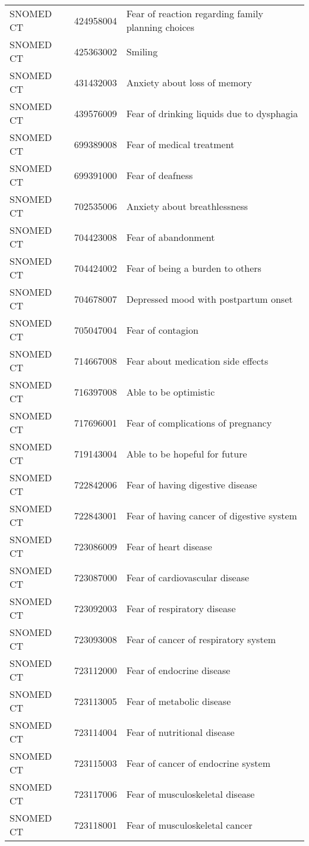 \begin{longtable}{p{}p{}p{}}
  SNOMED CT & 424958004 & Fear of reaction regarding family planning choices \\ 
  SNOMED CT & 425363002 & Smiling \\ 
  SNOMED CT & 431432003 & Anxiety about loss of memory \\ 
  SNOMED CT & 439576009 & Fear of drinking liquids due to dysphagia \\ 
  SNOMED CT & 699389008 & Fear of medical treatment \\ 
  SNOMED CT & 699391000 & Fear of deafness \\ 
  SNOMED CT & 702535006 & Anxiety about breathlessness \\ 
  SNOMED CT & 704423008 & Fear of abandonment \\ 
  SNOMED CT & 704424002 & Fear of being a burden to others \\ 
  SNOMED CT & 704678007 & Depressed mood with postpartum onset \\ 
  SNOMED CT & 705047004 & Fear of contagion \\ 
  SNOMED CT & 714667008 & Fear about medication side effects \\ 
  SNOMED CT & 716397008 & Able to be optimistic \\ 
  SNOMED CT & 717696001 & Fear of complications of pregnancy \\ 
  SNOMED CT & 719143004 & Able to be hopeful for future \\ 
  SNOMED CT & 722842006 & Fear of having digestive disease \\ 
  SNOMED CT & 722843001 & Fear of having cancer of digestive system \\ 
  SNOMED CT & 723086009 & Fear of heart disease \\ 
  SNOMED CT & 723087000 & Fear of cardiovascular disease \\ 
  SNOMED CT & 723092003 & Fear of respiratory disease \\ 
  SNOMED CT & 723093008 & Fear of cancer of respiratory system \\ 
  SNOMED CT & 723112000 & Fear of endocrine disease \\ 
  SNOMED CT & 723113005 & Fear of metabolic disease \\ 
  SNOMED CT & 723114004 & Fear of nutritional disease \\ 
  SNOMED CT & 723115003 & Fear of cancer of endocrine system \\ 
  SNOMED CT & 723117006 & Fear of musculoskeletal disease \\ 
  SNOMED CT & 723118001 & Fear of musculoskeletal cancer \\ 

\end{longtable}
